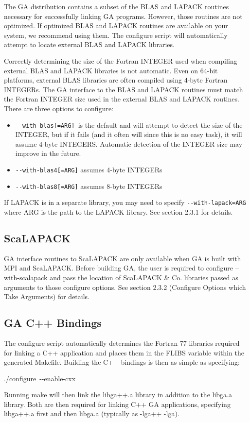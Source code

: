 The GA distribution contains a subset of the BLAS and LAPACK routines
necessary for successfully linking GA programs. However, those routines
are not optimized. If optimized BLAS and LAPACK routines are available
on your system, we recommend using them. The configure script will
automatically attempt to locate external BLAS and LAPACK libraries. 

Correctly determining the size of the Fortran INTEGER used when compiling
external BLAS and LAPACK libraries is not automatic. Even on 64-bit
platforms, external BLAS libraries are often compiled using 4-byte
Fortran INTEGERs. The GA interface to the BLAS and LAPACK routines
must match the Fortran INTEGER size used in the external BLAS and
LAPACK routines. There are three options to configure: 
\begin{itemize}
\item \texttt{-{}-with-blas{[}=ARG{]} }is the default and will attempt to
detect the size of the INTEGER, but if it fails (and it often will
since this is no easy task), it will assume 4-byte INTEGERS. Automatic
detection of the INTEGER size may improve in the future.
\item \texttt{-{}-with-blas4{[}=ARG{]}} assumes 4-byte INTEGERs 
\item \texttt{-{}-with-blas8{[}=ARG{]}} assumes 8-byte INTEGERs 
\end{itemize}
If LAPACK is in a separate library, you may need to specify \texttt{-{}-with-lapack=ARG}
where ARG is the path to the LAPACK library. See section 2.3.1 for
details. 


\subsection{ScaLAPACK }

GA interface routines to ScaLAPACK are only available when GA is built
with MPI and ScaLAPACK. Before building GA, the user is required to
configure --with-scalapack and pass the location of ScaLAPACK \& Co.
libraries passed as arguments to those configure options. See section
2.3.2 (Configure Options which Take Arguments) for details. 


\subsection{GA C++ Bindings }

The configure script automatically determines the Fortran 77 libraries
required for linking a C++ application and places them in the FLIBS
variable within the generated Makefile. Building the C++ bindings
is then as simple as specifying: 
\begin{lyxcode}
./configure~-{}-enable-cxx~
\end{lyxcode}
Running make will then link the libga++.a library in addition to the
libga.a library. Both are then required for linking C++ GA applications,
specifying libga++.a first and then libga.a (typically as -lga++ -lga). 


